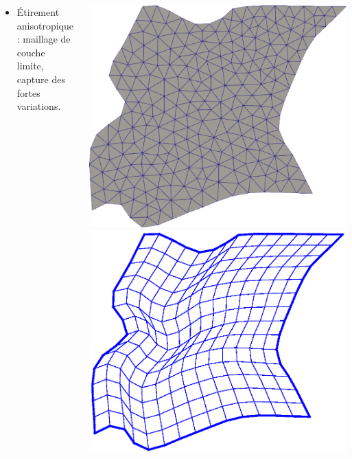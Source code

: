 \documentclass[compress,10pt,aspectratio=169]{beamer}
\begin{document}
\begin{frame}
\begin{columns}
\begin{column}{0.8\textwidth}
\begin{itemize}
\item {\color{onera} Étirement anisotropique :} maillage de couche limite, capture des fortes variations.\\\vspace{0.25cm}
\end{itemize}
    \end{column}
    \begin{column}{0.24\textwidth}
        \centering
        \includegraphics[scale=0.11]{images/zone4beamer.pdf}
        \includegraphics[scale=0.35]{images/mesh_zone4.eps}
    \end{column}
\end{columns}
\end{frame}
\end{document}
